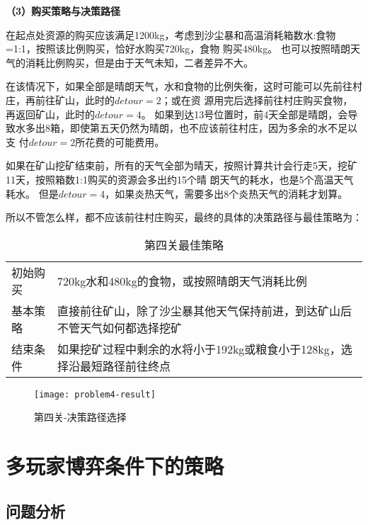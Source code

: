\documentclass[withoutpreface,bwprint]{cumcmthesis} %
\begin{document}
\textbf{（3）购买策略与决策路径}

在起点处资源的购买应该满足1200kg，考虑到沙尘暴和高温消耗箱数水:食物=1:1，按照该比例购买，恰好水购买720kg，食物
购买480kg。
也可以按照晴朗天气的消耗比例购买，但是由于天气未知，二者差异不大。

在该情况下，如果全部是晴朗天气，水和食物的比例失衡，这时可能可以先前往村庄，再前往矿山，此时的$detour=2$；或在资
源用完后选择前往村庄购买食物，再返回矿山，此时的$detour=4$。
如果到达13号位置时，前4天全部是晴朗，会导致水多出8箱，即使第五天仍然为晴朗，也不应该前往村庄，因为多余的水不足以支
付$detour=2$所花费的可能费用。

如果在矿山挖矿结束前，所有的天气全部为晴天，按照计算共计会行走5天，挖矿11天，按照箱数1:1购买的资源会多出约15个晴
朗天气的耗水，也是5个高温天气耗水。
但是$detour=4$，如果炎热天气，需要多出8个炎热天气的消耗才划算。

所以不管怎么样，都不应该前往村庄购买，最终的具体的决策路径与最佳策略为：

\begin{table}[!htbp]
    \caption{第四关最佳策略}\label{tab:strategy} \centering
    \begin{tabular}{p{2cm}p{13cm}}
        \midrule[1pt]
        初始购买 & 720kg水和480kg的食物，或按照晴朗天气消耗比例 \\
        基本策略 & 直接前往矿山，除了沙尘暴其他天气保持前进，到达矿山后不管天气如何都选择挖矿 \\
        结束条件 & 如果挖矿过程中剩余的水将小于192kg或粮食小于128kg，选择沿最短路径前往终点 \\
        \bottomrule[1pt]
    \end{tabular}
\end{table}

\begin{figure}[!h]
    \centering
    \texttt{[image: problem4-result]}
    \caption{第四关-决策路径选择}
    \label{fig:problem4-decision}
\end{figure}



\section{多玩家博弈条件下的策略}
\label{sec:simulate}


\subsection{问题分析}
\end{document}
